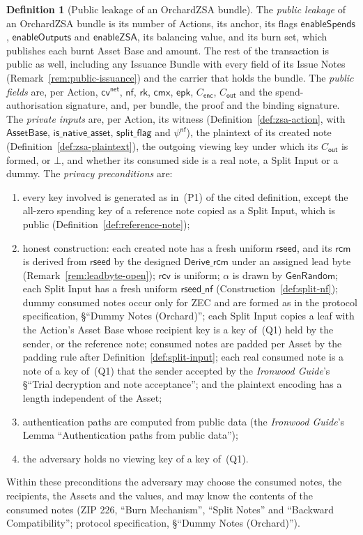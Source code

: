 \documentclass[11pt,a4paper]{article}
\theoremstyle{definition}
\newtheorem{definition}[theorem]{Definition}
\newcommand{\nfsym}{\mathsf{nf}}
\newcommand{\cmx}{\mathsf{cmx}}
\newcommand{\cvsym}{\mathsf{cv}}
\newcommand{\rk}{\mathsf{rk}}
\newcommand{\rcv}{\ensuremath{\mathsf{rcv}}}
\newcommand{\rcm}{\ensuremath{\mathsf{rcm}}}
\begin{document}
\begin{definition}[Public leakage of an OrchardZSA bundle]
\label{def:zsa-leakage}
The \emph{public leakage} of an OrchardZSA bundle is its number of Actions,
its anchor, its flags $\mathsf{enableSpends}$, $\mathsf{enableOutputs}$
and $\mathsf{enableZSA}$, its balancing value, and its burn set, which
publishes each burnt Asset Base and amount. The rest of the transaction is
public as well, including any Issuance Bundle with every field of its Issue
Notes (Remark~\ref{rem:public-issuance}) and the carrier that holds the
bundle. The \emph{public fields} are, per Action, $\cvsym^{\mathsf{net}}$,
$\nfsym$, $\rk$, $\cmx$, $\mathsf{epk}$, $C_{\mathsf{enc}}$,
$C_{\mathsf{out}}$ and the spend-authorisation signature, and, per bundle,
the proof and the binding signature. The \emph{private inputs} are, per
Action, its witness (Definition~\ref{def:zsa-action}, with
$\mathsf{AssetBase}$, $\mathsf{is\_native\_asset}$, $\mathsf{split\_flag}$
and $\psi^{\mathsf{nf}}$), the plaintext of its created note
(Definition~\ref{def:zsa-plaintext}), the outgoing viewing key under which
its $C_{\mathsf{out}}$ is formed, or $\bot$, and whether its consumed side is
a real note, a Split Input or a dummy. The \emph{privacy preconditions}
are:
\begin{enumerate}
\item[(Q1)] every key involved is generated as in~(P1) of the cited
  definition, except the all-zero spending key of a reference note copied
  as a Split Input, which is public (Definition~\ref{def:reference-note});
\item[(Q2)] honest construction: each created note has a fresh uniform
  $\mathsf{rseed}$, and its $\rcm$ is derived from $\mathsf{rseed}$ by the
  designed $\mathsf{Derive\_rcm}$ under an assigned lead byte
  (Remark~\ref{rem:leadbyte-open}); $\rcv$ is uniform; $\alpha$ is drawn by
  $\mathsf{GenRandom}$; each Split Input has a fresh uniform
  $\mathsf{rseed\_nf}$ (Construction~\ref{def:split-nf}); dummy consumed
  notes occur only for ZEC and are formed as in the protocol
  specification, \S``Dummy Notes (Orchard)''; each Split Input copies a
  leaf with the Action's Asset Base whose recipient key is a key of~(Q1)
  held by the sender, or the reference note; consumed notes are padded per
  Asset by the padding rule after Definition~\ref{def:split-input}; each
  real consumed note is a note of a key of~(Q1) that the sender accepted by
  the \emph{Ironwood Guide}'s \S``Trial decryption and note acceptance'';
  and the plaintext encoding has a length independent of the Asset;
\item[(Q3)] authentication paths are computed from public data (the
  \emph{Ironwood Guide}'s Lemma ``Authentication paths from public data'');
\item[(Q4)] the adversary holds no viewing key of a key of~(Q1).
\end{enumerate}
Within these preconditions the adversary may choose the consumed notes, the
recipients, the Assets and the values, and may know the contents of the
consumed notes (ZIP 226, ``Burn Mechanism'', ``Split Notes'' and
``Backward Compatibility''; protocol specification, \S``Dummy Notes
(Orchard)'').
\end{definition}
\end{document}
